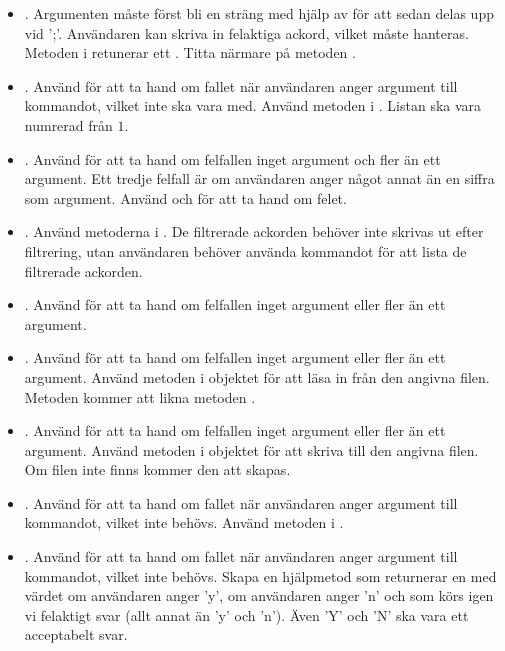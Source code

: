{\begin{itemize}
\item {}. Argumenten måste först bli en sträng med hjälp av  för att sedan delas upp vid ';'. Användaren kan skriva in felaktiga ackord, vilket måste hanteras. Metoden  i  retunerar ett . Titta närmare på metoden .

\item {}. Använd  för att ta hand om fallet när användaren anger argument till kommandot, vilket inte ska vara med. Använd metoden i . Listan ska vara numrerad från $1$.

\item {}. Använd  för att ta hand om felfallen inget argument och fler än ett argument. Ett tredje felfall är om användaren anger något annat än en siffra som argument. Använd  och  för att ta hand om felet.

\item {}. Använd metoderna i . De filtrerade ackorden behöver inte skrivas ut efter filtrering, utan användaren behöver använda kommandot  för att lista de filtrerade ackorden.

\item {}. Använd  för att ta hand om felfallen inget argument eller fler än ett argument.

\item {}. Använd  för att ta hand om felfallen inget argument eller fler än ett argument. Använd metoden  i objektet  för att läsa in från den angivna filen. Metoden kommer att likna metoden .

\item {}. Använd  för att ta hand om felfallen inget argument eller fler än ett argument. Använd metoden  i objektet  för att skriva till den angivna filen. Om filen inte finns kommer den att skapas.

\item {}. Använd  för att ta hand om fallet när användaren anger argument till kommandot, vilket inte behövs. Använd metoden i .

\item {}. Använd  för att ta hand om fallet när användaren anger argument till kommandot, vilket inte behövs. Skapa en hjälpmetod  som returnerar en  med värdet  om användaren anger 'y',  om användaren anger 'n' och som körs igen vi felaktigt svar (allt annat än 'y' och 'n'). Även 'Y' och 'N' ska vara ett acceptabelt svar.
\end{itemize}

}
